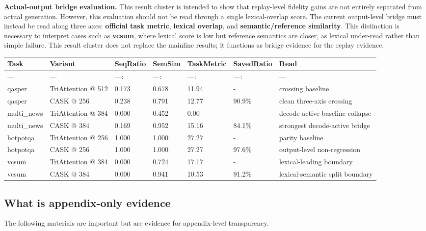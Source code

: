 \textbf{Actual-output bridge evaluation.} This result cluster is intended to show that replay-level fidelity gains are not entirely separated from actual generation. However, this evaluation should not be read through a single lexical-overlap score. The current output-level bridge must instead be read along three axes: \textbf{official task metric}, \textbf{lexical overlap}, and \textbf{semantic/reference similarity}. This distinction is necessary to interpret cases such as \textbf{vcsum}, where lexical score is low but reference semantics are closer, as lexical under-read rather than simple failure. This result cluster does not replace the mainline results; it functions as bridge evidence for the replay evidence.


\begin{table}[t]
\centering
\small
\begin{tabularx}{\textwidth}{YYYYYYY}
\toprule
Task & Variant & SeqRatio & SemSim & TaskMetric & SavedRatio & Read \\
\midrule
--- & --- & ---: & ---: & ---: & ---: & --- \\
qasper & TriAttention @ 512 & 0.173 & 0.678 & 11.94 & - & crossing baseline \\
qasper & CASK @ 256 & 0.238 & 0.791 & 12.77 & 90.9\% & clean three-axis crossing \\
multi\_news & TriAttention @ 384 & 0.000 & 0.452 & 0.00 & - & decode-active baseline collapse \\
multi\_news & CASK @ 384 & 0.169 & 0.952 & 15.16 & 84.1\% & strongest decode-active bridge \\
hotpotqa & TriAttention @ 256 & 1.000 & 1.000 & 27.27 & - & parity baseline \\
hotpotqa & CASK @ 256 & 1.000 & 1.000 & 27.27 & 97.6\% & output-level non-regression \\
vcsum & TriAttention @ 384 & 0.000 & 0.724 & 17.17 & - & lexical-leading boundary \\
vcsum & CASK @ 384 & 0.000 & 0.941 & 10.53 & 91.2\% & lexical-semantic split boundary \\
\bottomrule
\end{tabularx}
\end{table}


\subsection{What is appendix-only evidence}


The following materials are important but are evidence for appendix-level transparency.


